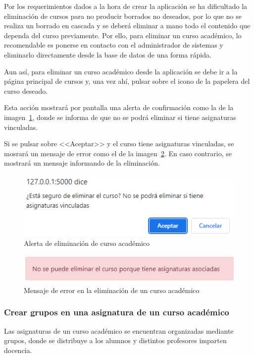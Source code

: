 Por los requerimientos dados a la hora de crear la aplicación se ha dificultado la eliminación de cursos para no producir borrados no deseados, por lo que no se realiza un borrado en cascada y se deberá eliminar a mano todo el contenido que dependa del curso previamente.
Por ello, para eliminar un curso académico, lo recomendable es ponerse en contacto con el administrador de sistemas y eliminarlo directamente desde la base de datos de una forma rápida.

Aun así, para eliminar un curso académico desde la aplicación se debe ir a la página principal de cursos y, una vez ahí, pulsar sobre el icono de la papelera del curso deseado.

Esta acción mostrará por pantalla una alerta de confirmación como la de la imagen~\ref{pag:alertElCurso}, donde se informa de que no se podrá eliminar si tiene asignaturas vinculadas.

Si se pulsar sobre <<Aceptar>> y el curso tiene asignaturas vinculadas, se mosrará un mensaje de error como el de la imagen~\ref{pag:menErrorElCurso}. 
En caso contrario, se mostrará un mensaje informando de la eliminación.

\begin{figure}
	\centering
	\includegraphics[width=.7\textwidth]{../img/Anexos/Manual usuario/alertElCurso.png}
	\caption{Alerta de eliminación de curso académico}\label{pag:alertElCurso}
\end{figure}

\begin{figure}
	\centering
	\includegraphics[width=\textwidth]{../img/Anexos/Manual usuario/menErrorElCurso.png}
	\caption{Mensaje de error en la eliminación de un curso académico}\label{pag:menErrorElCurso}
\end{figure}

\subsubsection{Crear grupos en una asignatura de un curso académico}
Las asignaturas de un curso académico se encuentran organizadas mediante grupos, donde se distribuye a los alumnos y distintos profesores imparten docencia.

